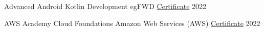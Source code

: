 


\begin{cvhonors}

  \cvhonor
    {Advanced Android Kotlin Development} %
    {egFWD} %
    {\textcolor{link}{\href{https://confirm.udacity.com/MHN2ZU5P}{Certificate}}} %
    {2022} %
    
     \cvhonor
    {AWS Academy Cloud Foundations} %
    {Amazon Web Services (AWS)} %
    {\textcolor{link}{\href{https://www.credly.com/badges/39661046-4d36-4c2b-83cf-1a730f6b86ea?source=linked_in_profile}{Certificate}}} %
    {2022} %
\end{cvhonors}
